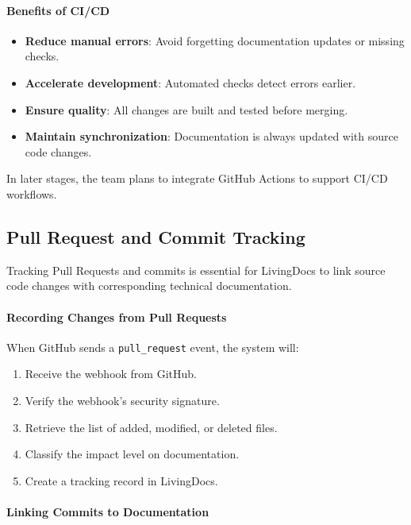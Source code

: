 \paragraph{Benefits of CI/CD}

\begin{itemize}
    \item \textbf{Reduce manual errors}: Avoid forgetting documentation updates or missing checks.
    \item \textbf{Accelerate development}: Automated checks detect errors earlier.
    \item \textbf{Ensure quality}: All changes are built and tested before merging.
    \item \textbf{Maintain synchronization}: Documentation is always updated with source code changes.
\end{itemize}

In later stages, the team plans to integrate GitHub Actions to support CI/CD workflows.

\subsection{Pull Request and Commit Tracking}

Tracking Pull Requests and commits is essential for LivingDocs to link source code changes with corresponding technical documentation.

\paragraph{Recording Changes from Pull Requests}

When GitHub sends a \texttt{pull\_request} event, the system will:

\begin{enumerate}
    \item Receive the webhook from GitHub.
    \item Verify the webhook’s security signature.
    \item Retrieve the list of added, modified, or deleted files.
    \item Classify the impact level on documentation.
    \item Create a tracking record in LivingDocs.
\end{enumerate}

\paragraph{Linking Commits to Documentation}

